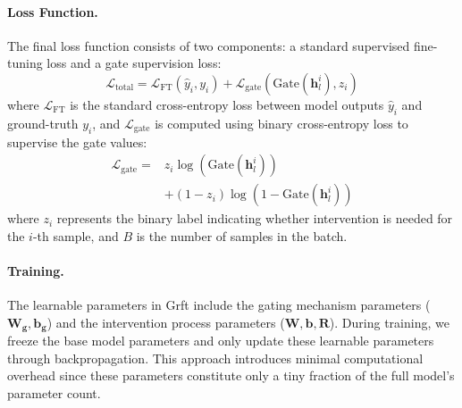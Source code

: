 \paragraph{Loss Function.} The final loss function consists of two components:  a standard supervised fine-tuning loss and a gate supervision loss:
\begin{equation}
    \mathcal{L}_{\text{total}} = \mathcal{L}_{\text{FT}}(\hat{y}_i,y_i ) + \mathcal{L}_{\text{gate}}(\text{Gate}(\mathbf{h}_l^i),z_i)
    \label{eq:loss}
\end{equation}
where $\mathcal{L}_{\text{FT}}$ is the standard cross-entropy loss between model outputs $\hat{y}_i$ and ground-truth $y_i$, and $\mathcal{L}_{\text{gate}}$ is computed using binary cross-entropy loss to supervise the gate values:
\begin{equation}
   \begin{aligned}
   \mathcal{L}_{\text{gate}} =  & z_i \log(\text{Gate}(\mathbf{h}_l^i)) \\ 
   & + (1-z_i) \log(1-\text{Gate}(\mathbf{h}_l^i)) 
   \end{aligned}
   \label{eq:gate_loss}
\end{equation}
where $z_i$ represents the binary label indicating whether intervention is needed for the $i$-th sample, and $B$ is the number of samples in the batch.  

\paragraph{Training.} The learnable parameters in Grft include the gating mechanism parameters ($\mathbf{W_g}, \mathbf{b_g}$) and the intervention process parameters ($\mathbf{W}, \mathbf{b}, \mathbf{R}$). During training, we freeze the base model parameters and only update these learnable parameters through backpropagation. This approach introduces minimal computational overhead since these parameters constitute only a tiny fraction of the full model's parameter count.



